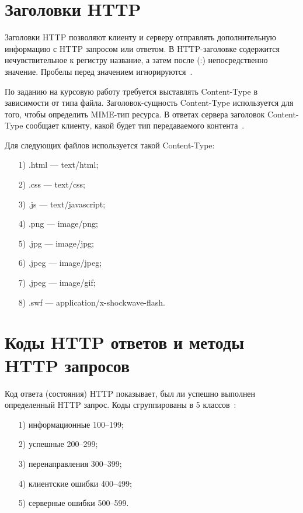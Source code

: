 \documentclass{bmstu}
\begin{document}
\section{Заголовки HTTP}

Заголовки HTTP позволяют клиенту и серверу отправлять дополнительную информацию с HTTP запросом или ответом. 
В HTTP-заголовке содержится нечувствительное к регистру название, а затем после (:) непосредственно значение. 
Пробелы перед значением игнорируются~\cite{MdnHttpHeaders2023}.

По заданию на курсовую работу требуется выставлять Content-Type в зависимости от типа файла. 
Заголовок-сущность Content-Type используется для того, чтобы определить MIME-тип ресурса. 
В ответах сервера заголовок Content-Type сообщает клиенту, какой будет тип передаваемого контента~\cite{MdnContentType2023}.

Для следующих файлов используется такой Content-Type:
\begin{enumerate}
\item[1)] .html --- text/html;
\item[2)] .css --- text/css;
\item[3)] .js --- text/javascript;
\item[4)] .png --- image/png;
\item[5)] .jpg --- image/jpg;
\item[6)] .jpeg --- image/jpeg;
\item[7)] .jpeg --- image/gif;
\item[8)] .swf --- application/x-shockwave-flash.
\end{enumerate}

\section{Коды HTTP ответов и методы HTTP запросов}

Код ответа (состояния) HTTP показывает, был ли успешно выполнен определенный HTTP запрос. 
Коды сгруппированы в 5 классов~\cite{MdnHttpStatus2023}:
\begin{enumerate}
\item[1)] информационные 100--199;
\item[2)] успешные 200--299;
\item[3)] перенаправления 300--399;
\item[4)] клиентские ошибки 400--499;
\item[5)] серверные ошибки 500--599.
\end{enumerate}
\end{document}
